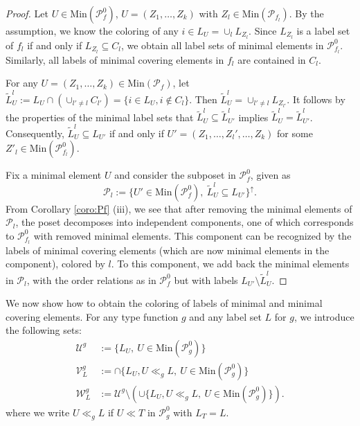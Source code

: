 \documentclass[12pt]{article}
\theoremstyle{definition}
\theoremstyle{remark}
\def\cover{\ll}
\def\Pe{\mathcal P}
\begin{document}
\begin{proof}
Let  $U\in \mathrm{Min}(\Pe_f^0)$,  $U=(Z_1,\dots, Z_k)$ with
  $Z_l\in \mathrm{Min}(\Pe_{f_l})$. By the assumption, we know the coloring of any $i\in
  L_U=\cup_l L_{Z_l}$. Since $L_{Z_l}$ is a label set of $f_l$ if and only if
  $L_{Z_l}\subseteq C_l$, we obtain all label sets of minimal elements in $\Pe_{f_l}^0$.
  Similarly, all labels of minimal covering elements in $f_l$ are contained in  $C_l$.

For any   $U=(Z_1,\dots,Z_k)\in \mathrm{Min}(\Pe_f)$, let $\tilde L_U^l:=L_U\cap
(\cup_{l'\ne l}C_{l'})=\{i\in L_U, i\notin C_l\}$. Then $\tilde L^l_U=\cup_{l'\ne l}
L_{Z_{l'}}$. It follows by the properties of the minimal label sets that $\tilde
L^l_U\subseteq \tilde L^l_{U'}$ implies $\tilde L^l_U=\tilde L_{U'}^l$. Consequently,
$\tilde L^l_U\subseteq L_{U'}$ if and only if 
$U'=(Z_1,\dots,Z_l',\dots,Z_k)$ for some $Z'_l\in \mathrm{Min}(\Pe_{f_l}^0)$. 

Fix a minimal element $U$ and consider the subposet in $\Pe_f^0$, given as
\[
\Pe_l:=\{U'\in \mathrm{Min}(\Pe_f^0),\ \tilde L^l_U\subseteq L_{U'}\}^\uparrow.
\]
From Corollary
\ref{coro:Pf} (iii), we see that after removing the minimal elements of $\Pe_l$, the poset
decomposes into independent components, one of which corresponds to $\Pe_{f_l}^0$ with
removed minimal elements. This component can be recognized by the labels of minimal
covering elements (which are now minimal elements in the component), colored by $l$. 
To this component, we add back the minimal elements in $\Pe_l$, with the order relations
as in $\Pe_f^0$ but with labels $L_{U'}\setminus \tilde L_U^l$. 


\end{proof}

We now show how to obtain the coloring of labels of minimal and minimal covering elements.
For any type function $g$ and any label set $L$ for $g$, we introduce the following sets:
\begin{align*}
\mathcal U^g&:=\{L_U,\ U\in \mathrm{Min}(\Pe_g^0)\}\\
\mathcal V_L^g&:=\cap \{L_U, U\cover_g L,\ U\in \mathrm{Min}(\Pe_g^0)\}\\
\mathcal W_L^g&:=\mathcal U^g\setminus (\cup\{L_U, U\cover_g L,\ U\in
\mathrm{Min}(\Pe_g^0) \}).
\end{align*}
where we write $U\cover_g L$ if $U\cover T$ in $\mathcal P_g^0$ with $L_T=L$.
\end{document}

